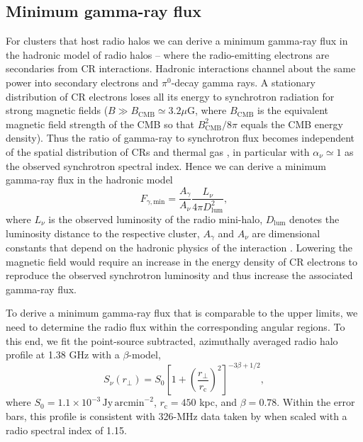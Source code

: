\documentclass[12pt,manuscript]{aastex}
\newcommand{\rmn}{\mathrm}
\newcommand{\dps}{\displaystyle}
\begin{document}
%
%

\subsection{Minimum gamma-ray flux}
\label{sec:Fmin}

For clusters that host radio halos we can derive a minimum gamma-ray flux in the hadronic model of
radio halos -- where the radio-emitting electrons are secondaries from CR interactions.  Hadronic
interactions channel about the same power into secondary electrons and $\pi^{0}$-decay gamma rays. A
stationary distribution of CR electrons loses all its energy to synchrotron radiation for strong
magnetic fields ($B \gg B_\rmn{CMB} \simeq 3.2 \mu$G, where $B_\rmn{CMB}$ is the equivalent magnetic
field strength of the CMB so that $B_\rmn{CMB}^2/8\pi$ equals the CMB energy density). Thus the
ratio of gamma-ray to synchrotron flux becomes independent of the spatial distribution of CRs and
thermal gas \citep{article:Voelk:1989, article:Pohl:1994, article:Pfrommer:2008}, in particular with
$\alpha_{\nu}\simeq 1$ as the observed synchrotron spectral index.  Hence we can derive a minimum
gamma-ray flux in the hadronic model
\begin{equation}
\label{eq:Fmin}
F_{\gamma,\rmn{min}} = \frac{\dps A_{\gamma}}{\dps A_{\nu}}\frac{\dps L_{\nu}}{\dps 4\pi D_{\rmn{lum}}^{2}},
\end{equation}
where $L_{\nu}$ is the observed luminosity of the radio mini-halo, $D_{\rmn{lum}}$ denotes the
luminosity distance to the respective cluster, $A_\gamma$ and $A_\nu$ are dimensional constants
that depend on the hadronic physics of the interaction \citep{article:Pfrommer:2008,
Pfrommer_etal:2008}. Lowering the magnetic field would require an increase in the energy density of
CR electrons to reproduce the observed synchrotron luminosity and thus increase the associated
gamma-ray flux.

To derive a minimum gamma-ray flux that is comparable to the upper limits, we need to determine the
radio flux within the corresponding angular regions. To this end, we fit the point-source
subtracted, azimuthally averaged radio halo profile at 1.38 GHz \citep{article:Deiss_etal:1997}
with a $\beta$-model,
\begin{equation}
\label{beta}
 S_{\nu} (r_{\bot})= S_{0} \left[ 1 + \left( \frac{r_{\bot}}{r_{\rmn{c}}}\right)^{2}\right]^{-3\beta + 1/2},
\end{equation}
where $S_{0} = 1.1 \times 10^{-3}\,\rmn{Jy\,arcmin}^{-2}$, $r_{\rmn{c}} = 450$ kpc, and
$\beta = 0.78$. Within the error bars, this profile is consistent with 326-MHz data taken by
\citet{article:Govoni_etal:2001} when scaled with a radio spectral index of 1.15.
\end{document}
